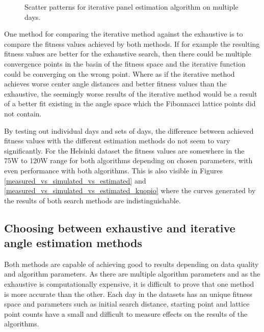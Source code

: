 \begin{figure}[H]
     
\caption{Scatter patterns for iterative panel estimation algorithm on multiple days.}




     \label{fig_iterative_visual_2}
\end{figure}

\noindent One method for comparing the iterative method against the exhaustive is to compare the fitness values achieved by both methods. If for example the resulting fitness values are better for the exhaustive search, then there could be multiple convergence points in the basin of the fitness space and the iterative function could be converging on the wrong point. Where as if the iterative method achieves worse center angle distances and better fitness values than the exhaustive, the seemingly worse results of the iterative method would be a result of a better fit existing in the angle space which the Fibonnacci lattice points did not contain. 

By testing out individual days and sets of days, the difference between achieved fitness values with the different estimation methods do not seem to vary significantly. For the Helsinki dataset the fitness values are somewhere in the 75W to 120W range for both algorithms depending on chosen parameters, with even performance with both algorithms. This is also visible in Figures \ref{measured_vs_simulated_vs_estimated} and \ref{measured_vs_simulated_vs_estimated_kuopio} where the curves generated by the results of both search methods are indistinguishable.



\subsection{Choosing between exhaustive and iterative angle estimation methods}
Both methods are capable of achieving good to results depending on data quality and algorithm parameters. As there are multiple algorithm parameters and as the exhaustive is computationally expensive, it is difficult to prove that one method is more accurate than the other. Each day in the datasets has an unique fitness space and parameters such as initial search distance, starting point and lattice point counts have a small and difficult to measure effects on the results of the algorithms.


